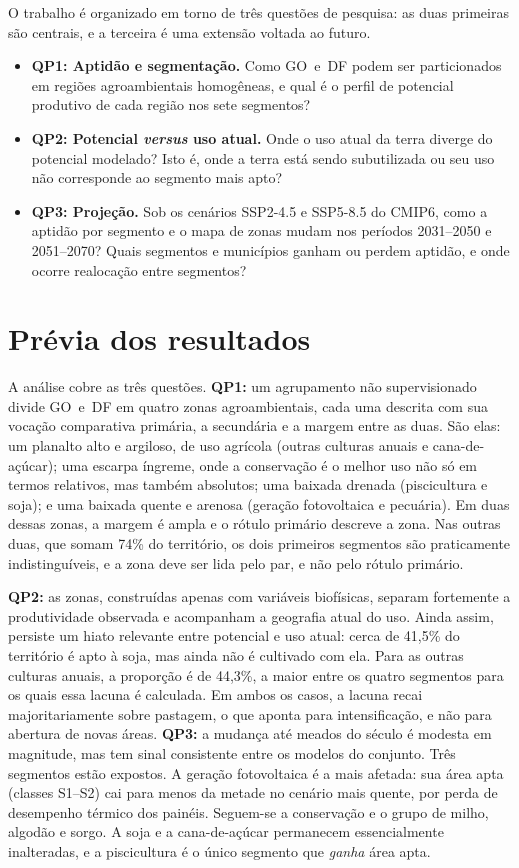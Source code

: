 O trabalho é organizado em torno de três questões de pesquisa: as duas primeiras são centrais, e
a terceira é uma extensão voltada ao futuro.

\begin{itemize}
  \item \textbf{QP1: Aptidão e segmentação.} Como GO~e~DF podem ser particionados em regiões
    agroambientais homogêneas, e qual é o perfil de potencial produtivo de cada região nos sete segmentos?
  \item \textbf{QP2: Potencial \emph{versus} uso atual.} Onde o uso atual da terra diverge do potencial
    modelado? Isto é, onde a terra está sendo subutilizada ou seu uso não corresponde ao segmento mais apto?
  \item \textbf{QP3: Projeção.} Sob os cenários SSP2-4.5 e SSP5-8.5 do CMIP6, como a aptidão por segmento
    e o mapa de zonas mudam nos períodos 2031--2050 e 2051--2070? Quais segmentos e municípios
    ganham ou perdem aptidão, e onde ocorre realocação entre segmentos?
\end{itemize}

\section{Prévia dos resultados}

A análise cobre as três questões. \textbf{QP1:} um agrupamento não supervisionado divide
GO~e~DF em quatro zonas agroambientais, cada uma descrita com sua vocação comparativa
primária, a secundária e a margem entre as duas. São elas: um planalto alto e argiloso, de uso agrícola
(outras culturas anuais e cana-de-açúcar); uma escarpa íngreme, onde a conservação é o melhor uso não só
em termos relativos, mas também absolutos; uma baixada drenada (piscicultura e soja); e uma baixada quente
e arenosa (geração fotovoltaica e pecuária). Em duas dessas zonas, a margem é ampla e o rótulo primário
descreve a zona. Nas outras duas, que somam 74\% do território, os dois primeiros segmentos são
praticamente indistinguíveis, e a zona deve ser lida pelo par, e não pelo rótulo primário.

\textbf{QP2:} as zonas, construídas apenas com variáveis biofísicas, separam fortemente a
produtividade observada e acompanham a geografia atual do uso. Ainda assim, persiste um hiato
relevante entre potencial e uso atual: cerca de 41,5\% do território é apto à soja, mas ainda
não é cultivado com ela. Para as outras culturas anuais, a proporção é de 44,3\%, a maior entre os
quatro segmentos para os quais essa lacuna é calculada. Em ambos os casos, a lacuna recai
majoritariamente sobre pastagem, o que aponta para intensificação, e não para abertura de novas áreas.
\textbf{QP3:} a mudança até meados do século é modesta em magnitude, mas tem sinal consistente
entre os modelos do conjunto. Três segmentos estão expostos. A geração fotovoltaica é a mais afetada:
sua área apta (classes S1--S2) cai para menos da metade no cenário mais quente, por perda de desempenho
térmico dos painéis. Seguem-se a conservação e o grupo de milho, algodão e sorgo. A soja e a
cana-de-açúcar permanecem essencialmente inalteradas, e a piscicultura é o único segmento que
\emph{ganha} área apta.

